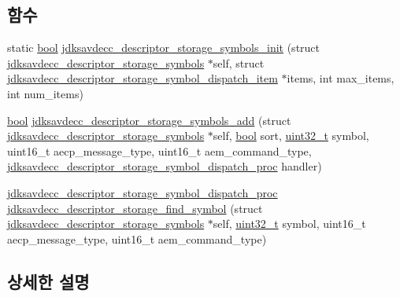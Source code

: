 \subsection*{함수}
\begin{DoxyCompactItemize}
\item 
static \hyperlink{avb__gptp_8h_af6a258d8f3ee5206d682d799316314b1}{bool} \hyperlink{group__jdksavdecc__descriptor__storage__symbol__dispatch_gadf3be01195933120673d4a067aa6aa8e}{jdksavdecc\+\_\+descriptor\+\_\+storage\+\_\+symbols\+\_\+init} (struct \hyperlink{structjdksavdecc__descriptor__storage__symbols}{jdksavdecc\+\_\+descriptor\+\_\+storage\+\_\+symbols} $\ast$self, struct \hyperlink{structjdksavdecc__descriptor__storage__symbol__dispatch__item}{jdksavdecc\+\_\+descriptor\+\_\+storage\+\_\+symbol\+\_\+dispatch\+\_\+item} $\ast$items, int max\+\_\+items, int num\+\_\+items)
\item 
\hyperlink{avb__gptp_8h_af6a258d8f3ee5206d682d799316314b1}{bool} \hyperlink{group__jdksavdecc__descriptor__storage__symbol__dispatch_gab09cc133c7df5b4e232aa98804f8adc0}{jdksavdecc\+\_\+descriptor\+\_\+storage\+\_\+symbols\+\_\+add} (struct \hyperlink{structjdksavdecc__descriptor__storage__symbols}{jdksavdecc\+\_\+descriptor\+\_\+storage\+\_\+symbols} $\ast$self, \hyperlink{avb__gptp_8h_af6a258d8f3ee5206d682d799316314b1}{bool} sort, \hyperlink{parse_8c_a6eb1e68cc391dd753bc8ce896dbb8315}{uint32\+\_\+t} symbol, uint16\+\_\+t aecp\+\_\+message\+\_\+type, uint16\+\_\+t aem\+\_\+command\+\_\+type, \hyperlink{group__jdksavdecc__descriptor__storage__symbol__dispatch_gaf1c817a8f34d849b268537e6093c69aa}{jdksavdecc\+\_\+descriptor\+\_\+storage\+\_\+symbol\+\_\+dispatch\+\_\+proc} handler)
\item 
\hyperlink{group__jdksavdecc__descriptor__storage__symbol__dispatch_gaf1c817a8f34d849b268537e6093c69aa}{jdksavdecc\+\_\+descriptor\+\_\+storage\+\_\+symbol\+\_\+dispatch\+\_\+proc} \hyperlink{group__jdksavdecc__descriptor__storage__symbol__dispatch_ga6a01c72623135341d8bd7ced55942687}{jdksavdecc\+\_\+descriptor\+\_\+storage\+\_\+find\+\_\+symbol} (struct \hyperlink{structjdksavdecc__descriptor__storage__symbols}{jdksavdecc\+\_\+descriptor\+\_\+storage\+\_\+symbols} $\ast$self, \hyperlink{parse_8c_a6eb1e68cc391dd753bc8ce896dbb8315}{uint32\+\_\+t} symbol, uint16\+\_\+t aecp\+\_\+message\+\_\+type, uint16\+\_\+t aem\+\_\+command\+\_\+type)
\end{DoxyCompactItemize}


\subsection{상세한 설명}


